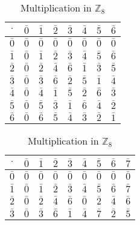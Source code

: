 \documentclass[12pt, titlepage]{amsart}
\newcommand\Z{{\mathbb Z}}
\theoremstyle{definition}
\begin{document}
	\begin{table}[h!]
		\centering
		\begin{minipage}{0.48\textwidth}
			\centering
			\caption{Multiplication in $\Z_7$}
			\label{Multiplication in Z_7}
			\begin{tabular}{|c|c|c|c|c|c|c|c|}
				\hline
			$\cdot$		& $\bar{0}$ & $\bar{1}$ & $\bar{2}$ & $\bar{3}$ & $\bar{4}$ & $\bar{5}$ & $\bar{6}$ \\ \hline
			$\bar{0}$	& $\bar{0}$ & $\bar{0}$ & $\bar{0}$ & $\bar{0}$ & $\bar{0}$ & $\bar{0}$ & $\bar{0}$ \\ \hline
			$\bar{1}$	& $\bar{0}$ & $\bar{1}$ & $\bar{2}$ & $\bar{3}$ & $\bar{4}$ & $\bar{5}$ & $\bar{6}$ \\ \hline
			$\bar{2}$	& $\bar{0}$ & $\bar{2}$ & $\bar{4}$ & $\bar{6}$ & $\bar{1}$ & $\bar{3}$ & $\bar{5}$ \\ \hline
			$\bar{3}$	& $\bar{0}$ & $\bar{3}$ & $\bar{6}$ & $\bar{2}$ & $\bar{5}$ & $\bar{1}$ & $\bar{4}$ \\ \hline
			$\bar{4}$	& $\bar{0}$ & $\bar{4}$ & $\bar{1}$ & $\bar{5}$ & $\bar{2}$ & $\bar{6}$ & $\bar{3}$ \\ \hline
			$\bar{5}$	& $\bar{0}$ & $\bar{5}$ & $\bar{3}$ & $\bar{1}$ & $\bar{6}$ & $\bar{4}$ & $\bar{2}$ \\ \hline
			$\bar{6}$	& $\bar{0}$ & $\bar{6}$ & $\bar{5}$ & $\bar{4}$ & $\bar{3}$ & $\bar{2}$ & $\bar{1}$ \\ \hline
			\end{tabular}
		\end{minipage}
		\hfill
		\begin{minipage}{0.48\textwidth}
			\centering
			\caption{Multiplication in $\Z_8$}
			\label{Multiplication in Z_8}
			\begin{tabular}{|c|c|c|c|c|c|c|c|c|}
				\hline
			$\cdot$		& $\bar{0}$ & $\bar{1}$ & $\bar{2}$ & $\bar{3}$ & $\bar{4}$ & $\bar{5}$ & $\bar{6}$ & $\bar{7}$ \\ \hline
			$\bar{0}$	& $\bar{0}$ & $\bar{0}$ & $\bar{0}$ & $\bar{0}$ & $\bar{0}$ & $\bar{0}$ & $\bar{0}$ & $\bar{0}$ \\ \hline
			$\bar{1}$	& $\bar{0}$ & $\bar{1}$ & $\bar{2}$ & $\bar{3}$ & $\bar{4}$ & $\bar{5}$ & $\bar{6}$ & $\bar{7}$ \\ \hline
			$\bar{2}$	& $\bar{0}$ & $\bar{2}$ & $\bar{4}$ & $\bar{6}$ & $\bar{0}$ & $\bar{2}$ & $\bar{4}$ & $\bar{6}$ \\ \hline
			$\bar{3}$	& $\bar{0}$ & $\bar{3}$ & $\bar{6}$ & $\bar{1}$ & $\bar{4}$ & $\bar{7}$ & $\bar{2}$ & $\bar{5}$ \\ \hline

\end{tabular}
\end{minipage}
\end{table}
\end{document}
